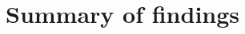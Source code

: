 \begin{figure}
    \centering
    \scalebox{0.8}{}
   \caption{\textit{}} 
\end{figure}

\section{Summary of findings}
